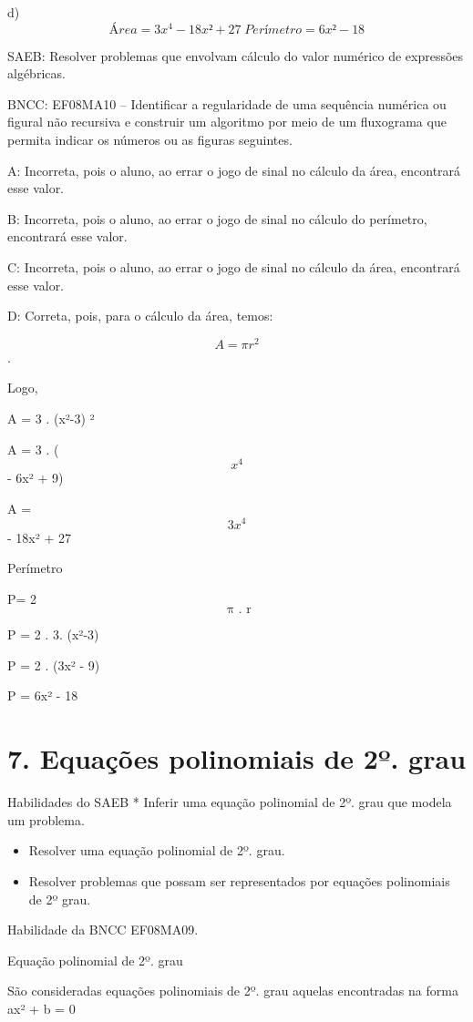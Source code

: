 d) \[Área = 3x^4 - 18x² + 27 \;Perímetro= 6x² - 18\]

SAEB: Resolver problemas que envolvam cálculo do valor numérico de
expressões algébricas.

BNCC: EF08MA10 -- Identificar a regularidade de uma sequência numérica
ou figural não recursiva e construir um algoritmo por meio de um
fluxograma que permita indicar os números ou as figuras seguintes.

A: Incorreta, pois o aluno, ao errar o jogo de sinal no cálculo da área,
encontrará esse valor.

B: Incorreta, pois o aluno, ao errar o jogo de sinal no cálculo do
perímetro, encontrará esse valor.

C: Incorreta, pois o aluno, ao errar o jogo de sinal no cálculo da área,
encontrará esse valor.

D: Correta, pois, para o cálculo da área, temos:

\[A = \pi r^{2}\].

Logo,

A = 3 . (x²-3) ²

A = 3 . (\[x^4\] - 6x² + 9)

A = \[3x^4\] - 18x² + 27

Perímetro

P= 2\[\text{\ π\ .\ r}\]

P = 2 . 3. (x²-3)

P = 2 . (3x² - 9)

P = 6x² - 18

\hypertarget{equauxe7uxf5es-polinomiais-de-2uxba.-grau}{%
\section{7. Equações polinomiais de 2º.
grau}\label{equauxe7uxf5es-polinomiais-de-2uxba.-grau}}

Habilidades do SAEB * Inferir uma equação polinomial de 2º. grau que
modela um problema.

\begin{itemize}
\item
  Resolver uma equação polinomial de 2º. grau.
\item
  Resolver problemas que possam ser representados por equações
  polinomiais de 2º grau.
\end{itemize}

Habilidade da BNCC EF08MA09.

Equação polinomial de 2º. grau

São consideradas equações polinomiais de 2º. grau aquelas encontradas na
forma ax² + b = 0

